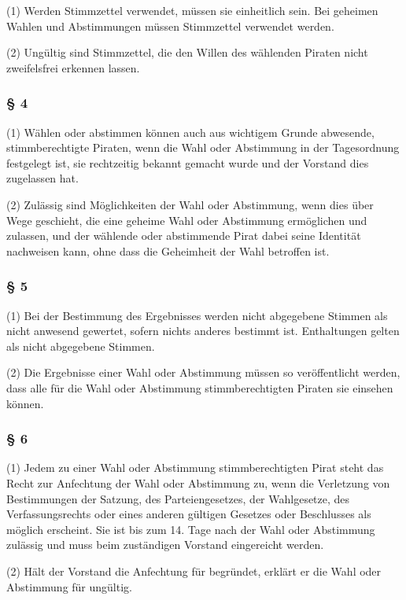 (1) Werden Stimmzettel verwendet, müssen sie einheitlich sein. Bei
geheimen Wahlen und Abstimmungen müssen Stimmzettel verwendet werden.

(2) Ungültig sind Stimmzettel, die den Willen des wählenden Piraten
nicht zweifelsfrei erkennen lassen.

\subsubsection{§ 4}

(1) Wählen oder abstimmen können auch aus wichtigem Grunde abwesende,
stimmberechtigte Piraten, wenn die Wahl oder Abstimmung in der
Tagesordnung festgelegt ist, sie rechtzeitig bekannt gemacht wurde und
der Vorstand dies zugelassen hat.

(2) Zulässig sind Möglichkeiten der Wahl oder Abstimmung, wenn dies über
Wege geschieht, die eine geheime Wahl oder Abstimmung ermöglichen und
zulassen, und der wählende oder abstimmende Pirat dabei seine Identität
nachweisen kann, ohne dass die Geheimheit der Wahl betroffen ist.

\subsubsection{§ 5}

(1) Bei der Bestimmung des Ergebnisses werden nicht abgegebene Stimmen
als nicht anwesend gewertet, sofern nichts anderes bestimmt ist.
Enthaltungen gelten als nicht abgegebene Stimmen.

(2) Die Ergebnisse einer Wahl oder Abstimmung müssen so veröffentlicht
werden, dass alle für die Wahl oder Abstimmung stimmberechtigten Piraten
sie einsehen können.

\subsubsection{§ 6}

(1) Jedem zu einer Wahl oder Abstimmung stimmberechtigten Pirat steht
das Recht zur Anfechtung der Wahl oder Abstimmung zu, wenn die
Verletzung von Bestimmungen der Satzung, des Parteiengesetzes, der
Wahlgesetze, des Verfassungsrechts oder eines anderen gültigen Gesetzes
oder Beschlusses als möglich erscheint. Sie ist bis zum 14. Tage nach
der Wahl oder Abstimmung zulässig und muss beim zuständigen Vorstand
eingereicht werden.

(2) Hält der Vorstand die Anfechtung für begründet, erklärt er die Wahl
oder Abstimmung für ungültig.

